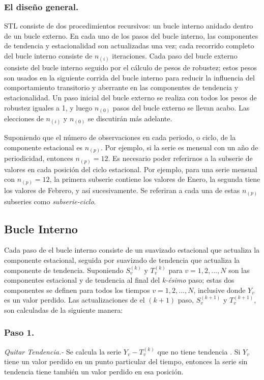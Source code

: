 \documentclass[12pt,oneside]{book}\usepackage[]{graphicx}\usepackage[]{color}
\theoremstyle{definition} %
\begin{document}
\subsubsection{El diseño general.}

STL consiste de dos procedimientos recursivos: un bucle interno anidado dentro de un bucle externo. En cada uno de los pasos del bucle interno, las componentes de tendencia y estacionalidad son actualizadas una vez; cada recorrido completo del bucle interno consiste de $n_{(i)}$ iteraciones. Cada paso del bucle externo consiste del bucle interno seguido por el cálculo de pesos de robustez; estos pesos son usados en la siguiente corrida del bucle interno para reducir la influencia del comportamiento transitorio y aberrante en las componentes de tendencia y  estacionalidad. Un paso inicial del bucle externo se realiza con todos los pesos de robustez iguales a 1, y luego $n_{(0)}$ pasos del bucle externo se llevan acabo. Las elecciones de $n_{(i)}$ y $n_{(0)}$ se discutirán más adelante. 

Suponiendo que el número de observaciones en cada periodo, o ciclo, de la componente estacional es $n_{(p)}$. Por ejemplo, si la serie es mensual con un año de periodicidad, entonces $n_{(p)}=12$. Es necesario poder referirnos a la subserie de valores en cada posición del ciclo estacional. Por ejemplo, para una serie mensual con $n_{(p)}=12$, la primera subserie contiene los valores de Enero, la segunda tiene los valores de Febrero, y así sucesivamente. Se referiran a cada una de estas $n_{(p)}$ subseries como \textit{subserie-ciclo}.

\subsection{Bucle Interno}

Cada paso de el bucle interno consiste de un suavizado estacional que actualiza la componente estacional, seguida por suavizado de tendencia que actualiza la componente de tendencia. Suponiendo $S_v^{(k)}$ y $T_v^{(k)}$ para $v=1,2,...,N$ son las componentes estacional y de tendencia al final del \textit{k-ésimo} paso; estas dos componentes se definen para todos los tiempos $v=1,2,...,N$, inclusive donde $Y_v$ es un valor perdido. Las actualizaciones de el $(k+1)$ paso, $S_v^{(k+1)}$ y $T_v^{(k+1)}$, son calculadas de la siguiente manera:

\subsubsection{Paso 1.} \textit{Quitar Tendencia.-}
\label{sbsec:paso1}
Se calcula la serie $Y_v-T_v^{(k)}$ que no tiene tendencia . Si $Y_v$ tiene un valor perdido en un punto particular del tiempo, entonces la serie sin tendencia tiene también un valor perdido en esa posición.
\end{document}
